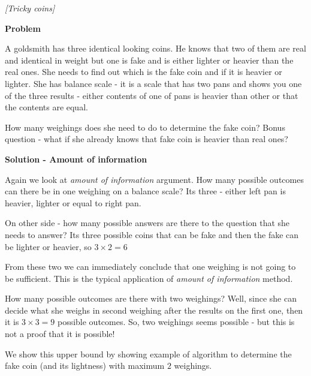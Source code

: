\begin{problem}
\textit{[Tricky coins]}

\textbf{Problem}

A goldsmith has three identical looking coins. He knows that two of them are real and identical in weight but one is fake and is either lighter or heavier than the real ones. She needs to find out which is the fake coin and if it is heavier or lighter.
She has balance scale - it is a scale that has two pans and shows you one of the three results - either contents of one of pans is heavier than other or that the contents are equal.

How many weighings does she need to do to determine the fake coin? Bonus question - what if she already knows that fake coin is heavier than real ones?


\textbf{Solution - Amount of information}

Again we look at \textit{amount of information} argument. How many possible outcomes can there be in one weighing on a balance scale? Its three - either left pan is heavier, lighter or equal to right pan.

On other side - how many possible answers are there to the question that she needs to answer? Its three possible coins that can be fake and then the fake can be lighter or heavier, so $3\times2=6$

From these two we can immediately conclude that one weighing is not going to be sufficient. This is the typical application of \textit{amount of information} method.

How many possible outcomes are there with two weighings? Well, since she can decide what she weighs in second weighing after the results on the first one, then it is $3\times3 = 9$ possible outcomes. So, two weighings seems possible - but this is not a proof that it is possible!

We show this upper bound by showing example of algorithm to determine the fake coin (and its lightness) with maximum $2$ weighings. 


\end{problem}
